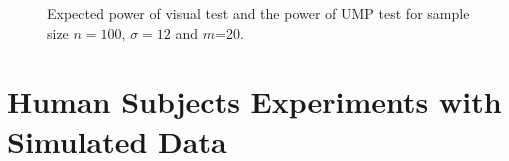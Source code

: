 \documentclass{article}
\begin{document}
\begin{figure}[hbtp]
   \centering
       \caption{Expected power of visual test  and the power of UMP test for sample size $n =100$, $\sigma = 12$ and $m$=20. }
       \label{fig:power_expected}
\end{figure}





%

\section{Human Subjects Experiments with Simulated Data} \label{sec:simulation}
\end{document}
